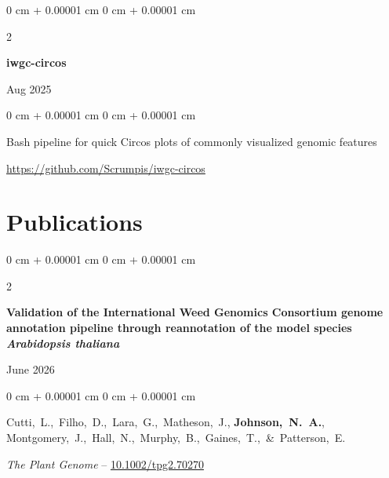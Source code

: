 \documentclass[10pt, letterpaper]{article}
\newenvironment{onecolentry}{
    \begin{adjustwidth}{
        0 cm + 0.00001 cm
    }{
        0 cm + 0.00001 cm
    }
}{
    \end{adjustwidth}
} %
\newenvironment{twocolentry}[2][]{
    \onecolentry
    \def\secondColumn{#2}
    \setcolumnwidth{\fill, 4.5 cm}
    \begin{paracol}{2}
}{
    \switchcolumn \raggedleft \secondColumn
    \end{paracol}
    \endonecolentry
} %
\begin{document}
        
        \begin{samepage}
            \begin{twocolentry}{
                Aug 2025
                }
                \textbf{iwgc-circos}
            \end{twocolentry}

            \vspace{0.10 cm}
            
            \begin{onecolentry}
                Bash pipeline for quick Circos plots of commonly visualized genomic features

                \vspace{0.10 cm}
                
                \href{https://github.com/Scrumpis/iwgc-circos}{https://github.com/Scrumpis/iwgc-circos}
            \end{onecolentry}
        \end{samepage}            



        
    \section{Publications}




        \begin{samepage}
            \begin{twocolentry}{
                June 2026
                }
                \textbf{Validation of the International Weed Genomics Consortium genome annotation pipeline through reannotation of the model species \textit{Arabidopsis thaliana}}
            \end{twocolentry}

            \vspace{0.10 cm}
            
            \begin{onecolentry}
                \mbox{Cutti, L., Filho, D., Lara, G., Matheson, J.,}
                \mbox{\textbf{Johnson, N. A.}},
                \mbox{Montgomery, J., Hall, N., Murphy, B., Gaines, T., \& Patterson, E.}

                \vspace{0.10 cm}
                
                \textit{The Plant Genome} -- \href{https://doi.org/10.1002/tpg2.70270}{10.1002/tpg2.70270}
            \end{onecolentry}
        \end{samepage}
\end{document}

